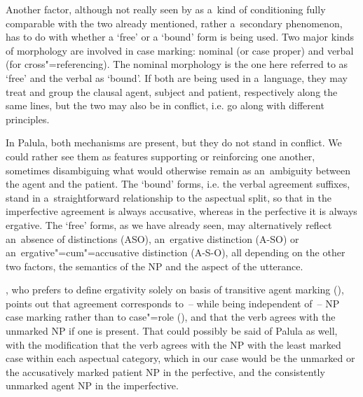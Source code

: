 Another factor, although not really seen by \citet[94]{dixon1994} as a~kind of conditioning fully comparable with the two already mentioned, rather a~secondary phenomenon, has to do with whether a `free' or a `bound' form is being used. Two major kinds of morphology are involved in case marking: nominal (or case proper) and verbal (for cross"=referencing). The nominal morphology is the one here referred to as `free' and the verbal as `bound'. If both are being used in a~language, they may treat and group the clausal agent, subject and patient, respectively along the same lines, but the two may also be in conflict, i.e. go along with different principles. 



In Palula, both mechanisms are present, but they do not stand in conflict. We could rather see them as features supporting or reinforcing one another, sometimes disambiguing what would otherwise remain as an~ambiguity between the agent and the patient. The `bound' forms, i.e. the verbal agreement suffixes, stand in a~straightforward relationship to the aspectual split, so that in the imperfective agreement is always accusative, whereas in the perfective it is always ergative. The `free' forms, as we have already seen, may alternatively reflect an~absence of distinctions (ASO), an~ergative distinction (A-SO) or an~ergative"=cum"=accusative distinction (A-S-O), all depending on the other two factors, the semantics of the NP and the aspect of the utterance. 



\citeauthor{delancey1981}, who prefers to define ergativity solely on basis of transitive agent marking (\citeyear[628]{delancey1981}), points out that agreement corresponds to~-- while being independent of~-- NP case marking rather than to case"=role (\citeyear[631]{delancey1981}), and that the verb agrees with the unmarked NP if one is present. That could possibly be said of Palula as well, with the modification that the verb agrees with the NP with the least marked case within each aspectual category, which in our case would be the unmarked or the accusatively marked patient NP in the perfective, and the consistently unmarked agent NP in the imperfective.